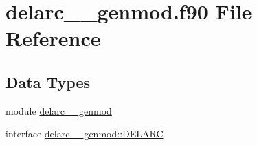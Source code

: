 \hypertarget{delarc____genmod_8f90}{\section{delarc\+\_\+\+\_\+genmod.\+f90 File Reference}
\label{delarc____genmod_8f90}
}
\subsection*{Data Types}
\begin{DoxyCompactItemize}
\item 
module \hyperlink{classdelarc____genmod}{delarc\+\_\+\+\_\+genmod}
\item 
interface \hyperlink{interfacedelarc____genmod_1_1DELARC}{delarc\+\_\+\+\_\+genmod\+::\+D\+E\+L\+A\+R\+C}
\end{DoxyCompactItemize}

